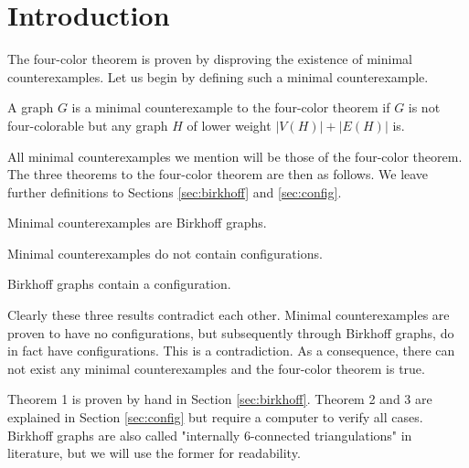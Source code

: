 \section{Introduction}

The four-color theorem is proven by disproving the existence of minimal counterexamples. Let us begin by defining such a minimal counterexample.
\begin{definition}
A graph $G$ is a minimal counterexample to the four-color theorem if $G$ is not four-colorable but any graph $H$ of lower weight $|V(H)|+|E(H)|$ is.
\end{definition}

All minimal counterexamples we mention will be those of the four-color theorem.
The three theorems to the four-color theorem are then as follows. We leave further definitions to Sections \ref{sec:birkhoff} and \ref{sec:config}.

\begin{theorem}
Minimal counterexamples are Birkhoff graphs.
\end{theorem}

\begin{theorem}
Minimal counterexamples do not contain configurations.
\end{theorem}

\begin{theorem}
Birkhoff graphs contain a configuration.
\end{theorem}

Clearly these three results contradict each other. Minimal counterexamples are proven to have no configurations, but subsequently through Birkhoff graphs, do in fact have configurations. This is a contradiction. As a consequence, there can not exist any minimal counterexamples and the four-color theorem is true. 

Theorem 1 is proven by hand in Section \ref{sec:birkhoff}. Theorem 2 and 3 are explained in Section \ref{sec:config} but require a computer to verify all cases. Birkhoff graphs are also called "internally 6-connected triangulations" in literature, but we will use the former for readability.

